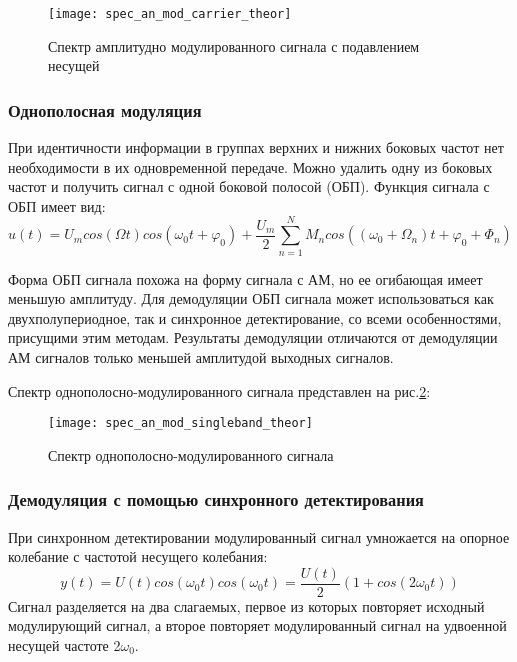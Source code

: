 \begin{figure}[H]
	\begin{center}
		\texttt{[image: spec\_an\_mod\_carrier\_theor]}
		\caption{Спектр амплитудно модулированного сигнала с подавлением несущей} 
		\label{pic:spec_an_mod_carrier_theor} %
	\end{center}
\end{figure}

\subsubsection{Однополосная модуляция}
При идентичности информации в группах верхних и нижних боковых частот нет необходимости в их одновременной передаче. 
Можно удалить одну из боковых частот и получить сигнал с одной боковой полосой (ОБП).
Функция сигнала с ОБП имеет вид:
 \begin{equation}
	u(t) = U_m cos(\Omega t) cos(\omega_0 t + \varphi _0) + \frac{U_m}{2} \sum_{n=1}^{N}  M_n cos((\omega_0 + \Omega_n) t + \varphi _0 + \Phi _n)
\end{equation}

Форма ОБП сигнала похожа на форму сигнала с  АМ, но ее огибающая имеет меньшую амплитуду. 
Для демодуляции ОБП сигнала может использоваться как двухполупериодное, так и синхронное детектирование, со всеми особенностями, присущими этим методам. 
Результаты демодуляции отличаются от демодуляции АМ сигналов только меньшей амплитудой выходных сигналов.

Спектр однополосно-модулированного сигнала представлен на рис.\ref{pic:spec_an_mod_singleband_theor}:
\begin{figure}[H]
	\begin{center}
		\texttt{[image: spec\_an\_mod\_singleband\_theor]}
		\caption{Спектр однополосно-модулированного сигнала} 
		\label{pic:spec_an_mod_singleband_theor} %
	\end{center}
\end{figure}

\subsubsection{Демодуляция с помощью синхронного детектирования}
При синхронном детектировании модулированный сигнал умножается на опорное колебание с частотой несущего колебания:
 \begin{equation}
	y(t) = U(t) cos(\omega_0 t) cos(\omega_0 t) = \frac{U(t)}{2} (1 + cos(2\omega_0 t))
\end{equation}
Сигнал разделяется на два слагаемых, первое из которых повторяет исходный модулирующий сигнал, а второе повторяет модулированный сигнал на удвоенной несущей частоте 2$\omega_0$. 

